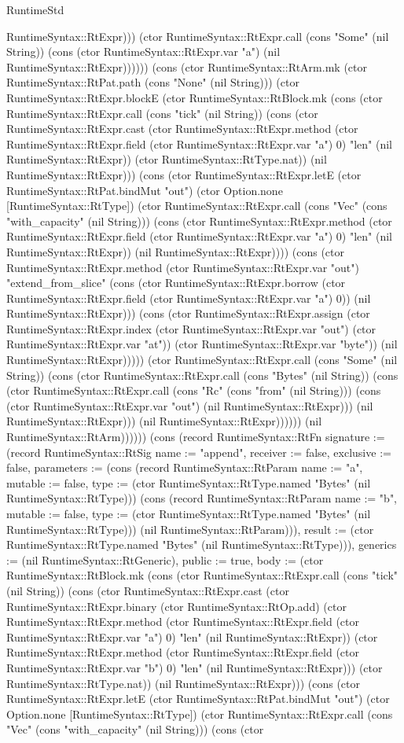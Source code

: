 \begin{lexlean}{RuntimeStd}
\begin{semanticmodule}
{RuntimeSyntax::RtExpr))) (ctor RuntimeSyntax::RtExpr.call (cons "Some" (nil String)) (cons (ctor RuntimeSyntax::RtExpr.var "a") (nil RuntimeSyntax::RtExpr)))))) (cons (ctor RuntimeSyntax::RtArm.mk (ctor RuntimeSyntax::RtPat.path (cons "None" (nil String))) (ctor RuntimeSyntax::RtExpr.blockE (ctor RuntimeSyntax::RtBlock.mk (cons (ctor RuntimeSyntax::RtExpr.call (cons "tick" (nil String)) (cons (ctor RuntimeSyntax::RtExpr.cast (ctor RuntimeSyntax::RtExpr.method (ctor RuntimeSyntax::RtExpr.field (ctor RuntimeSyntax::RtExpr.var "a") 0) "len" (nil RuntimeSyntax::RtExpr)) (ctor RuntimeSyntax::RtType.nat)) (nil RuntimeSyntax::RtExpr))) (cons (ctor RuntimeSyntax::RtExpr.letE (ctor RuntimeSyntax::RtPat.bindMut "out") (ctor Option.none [RuntimeSyntax::RtType]) (ctor RuntimeSyntax::RtExpr.call (cons "Vec" (cons "with_capacity" (nil String))) (cons (ctor RuntimeSyntax::RtExpr.method (ctor RuntimeSyntax::RtExpr.field (ctor RuntimeSyntax::RtExpr.var "a") 0) "len" (nil RuntimeSyntax::RtExpr)) (nil RuntimeSyntax::RtExpr)))) (cons (ctor RuntimeSyntax::RtExpr.method (ctor RuntimeSyntax::RtExpr.var "out") "extend_from_slice" (cons (ctor RuntimeSyntax::RtExpr.borrow (ctor RuntimeSyntax::RtExpr.field (ctor RuntimeSyntax::RtExpr.var "a") 0)) (nil RuntimeSyntax::RtExpr))) (cons (ctor RuntimeSyntax::RtExpr.assign (ctor RuntimeSyntax::RtExpr.index (ctor RuntimeSyntax::RtExpr.var "out") (ctor RuntimeSyntax::RtExpr.var "at")) (ctor RuntimeSyntax::RtExpr.var "byte")) (nil RuntimeSyntax::RtExpr))))) (ctor RuntimeSyntax::RtExpr.call (cons "Some" (nil String)) (cons (ctor RuntimeSyntax::RtExpr.call (cons "Bytes" (nil String)) (cons (ctor RuntimeSyntax::RtExpr.call (cons "Rc" (cons "from" (nil String))) (cons (ctor RuntimeSyntax::RtExpr.var "out") (nil RuntimeSyntax::RtExpr))) (nil RuntimeSyntax::RtExpr))) (nil RuntimeSyntax::RtExpr)))))) (nil RuntimeSyntax::RtArm)))))}) (cons (record RuntimeSyntax::RtFn {signature := (record RuntimeSyntax::RtSig {name := "append", receiver := false, exclusive := false, parameters := (cons (record RuntimeSyntax::RtParam {name := "a", mutable := false, type := (ctor RuntimeSyntax::RtType.named "Bytes" (nil RuntimeSyntax::RtType))}) (cons (record RuntimeSyntax::RtParam {name := "b", mutable := false, type := (ctor RuntimeSyntax::RtType.named "Bytes" (nil RuntimeSyntax::RtType))}) (nil RuntimeSyntax::RtParam))), result := (ctor RuntimeSyntax::RtType.named "Bytes" (nil RuntimeSyntax::RtType))}), generics := (nil RuntimeSyntax::RtGeneric), public := true, body := (ctor RuntimeSyntax::RtBlock.mk (cons (ctor RuntimeSyntax::RtExpr.call (cons "tick" (nil String)) (cons (ctor RuntimeSyntax::RtExpr.cast (ctor RuntimeSyntax::RtExpr.binary (ctor RuntimeSyntax::RtOp.add) (ctor RuntimeSyntax::RtExpr.method (ctor RuntimeSyntax::RtExpr.field (ctor RuntimeSyntax::RtExpr.var "a") 0) "len" (nil RuntimeSyntax::RtExpr)) (ctor RuntimeSyntax::RtExpr.method (ctor RuntimeSyntax::RtExpr.field (ctor RuntimeSyntax::RtExpr.var "b") 0) "len" (nil RuntimeSyntax::RtExpr))) (ctor RuntimeSyntax::RtType.nat)) (nil RuntimeSyntax::RtExpr))) (cons (ctor RuntimeSyntax::RtExpr.letE (ctor RuntimeSyntax::RtPat.bindMut "out") (ctor Option.none [RuntimeSyntax::RtType]) (ctor RuntimeSyntax::RtExpr.call (cons "Vec" (cons "with_capacity" (nil String))) (cons (ctor }
\end{semanticmodule}
\end{lexlean}
